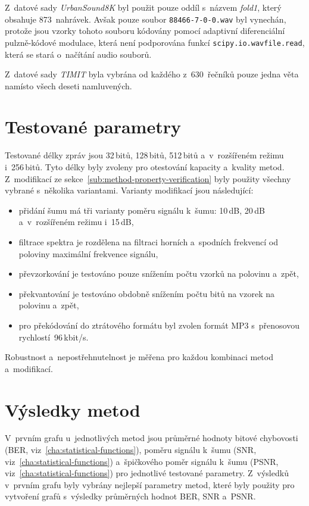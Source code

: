 Z~datové sady \textit{UrbanSound8K} byl použit pouze oddíl s~názvem
\textit{fold1}, který obsahuje 873~nahrávek. Avšak pouze soubor
\texttt{88466-7-0-0.wav} byl vynechán, protože jsou vzorky tohoto souboru
kódovány pomocí adaptivní diferenciální pulzně-kódové modulace, která není
podporována funkcí \texttt{scipy.io.wavfile.read}, která se stará o~načítání
audio souborů.

Z~datové sady \textit{TIMIT} byla vybrána od každého z~630~řečníků pouze jedna
věta namísto všech deseti namluvených.

\section{Testované parametry}
\label{sec:tested-parameters}

Testované délky zpráv jsou 32\,bitů, 128\,bitů, 512\,bitů a~v~rozšířeném režimu
i~256\,bitů. Tyto délky byly zvoleny pro otestování kapacity a~kvality metod.
Z~modifikací ze sekce~\ref{sub:method-property-verification} byly použity
všechny vybrané s~několika variantami. Varianty modifikací jsou následující:

\begin{itemize}
    \item přidání šumu má tři varianty poměru signálu k~šumu: 10\,dB, 20\,dB
        a~v~rozšířeném režimu i~15\,dB,
    \item filtrace spektra je rozdělena na filtraci horních a~spodních
        frekvencí od poloviny maximální frekvence signálu,
    \item převzorkování je testováno pouze snížením počtu vzorků na polovinu
        a~zpět,
    \item překvantování je testováno obdobně snížením počtu bitů na vzorek na
        polovinu a~zpět,
    \item pro překódování do ztrátového formátu byl zvolen formát MP3
        s~přenosovou rychlostí~96\,kbit/s.
\end{itemize}

\noindent Robustnost a~nepostřehnutelnost je měřena pro každou kombinaci metod
a~modifikací.

\section{Výsledky metod}
\label{sec:evaluation-results}

V~prvním grafu u~jednotlivých metod jsou průměrné hodnoty bitové chybovosti
(BER, viz~\ref{cha:statistical-functions}), poměru signálu k~šumu (SNR,
viz~\ref{cha:statistical-functions}) a~špičkového poměr signálu k~šumu (PSNR,
viz~\ref{cha:statistical-functions}) pro jednotlivé testované parametry.
Z~výsledků v~prvním grafu byly vybrány nejlepší parametry metod, které byly
použity pro vytvoření grafů s~výsledky průměrných hodnot BER, SNR a~PSNR.

